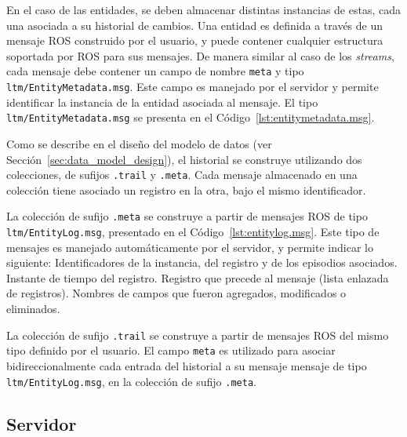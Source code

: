 En el caso de las entidades, se deben almacenar distintas instancias de estas, cada una asociada a su historial de cambios. Una entidad es definida a través de un mensaje ROS construido por el usuario, y puede contener cualquier estructura soportada por ROS para sus mensajes. De manera similar al caso de los \textit{streams}, cada mensaje debe contener un campo de nombre \texttt{meta} y tipo \texttt{ltm/EntityMetadata.msg}. Este campo es manejado por el servidor y permite identificar la instancia de la entidad asociada al mensaje. El tipo \texttt{ltm/EntityMetadata.msg} se presenta en el Código~\ref{lst:entitymetadata.msg}.
\lstset{style=/Style/ROS/MSG}


Como se describe en el diseño del modelo de datos (ver Sección~\ref{sec:data_model_design}), el historial se construye utilizando dos colecciones, de sufijos \texttt{.trail} y \texttt{.meta}. Cada mensaje almacenado en una colección tiene asociado un registro en la otra, bajo el mismo identificador. 

La colección de sufijo \texttt{.meta} se construye a partir de mensajes ROS de tipo \texttt{ltm/EntityLog.msg}, presentado en el Código~\ref{lst:entitylog.msg}. Este tipo de mensajes es manejado automáticamente por el servidor, y permite indicar lo siguiente: Identificadores de la instancia, del registro y de los episodios asociados. Instante de tiempo del registro. Registro que precede al mensaje (lista enlazada de registros). Nombres de campos que fueron agregados, modificados o eliminados.
\lstset{style=/Style/ROS/MSG}


La colección de sufijo \texttt{.trail} se construye a partir de mensajes ROS del mismo tipo definido por el usuario. El campo \texttt{meta} es utilizado para asociar bidireccionalmente cada entrada del historial a su mensaje mensaje de tipo \texttt{ltm/EntityLog.msg}, en la colección de sufijo \texttt{.meta}.
 

\subsection{Servidor}


